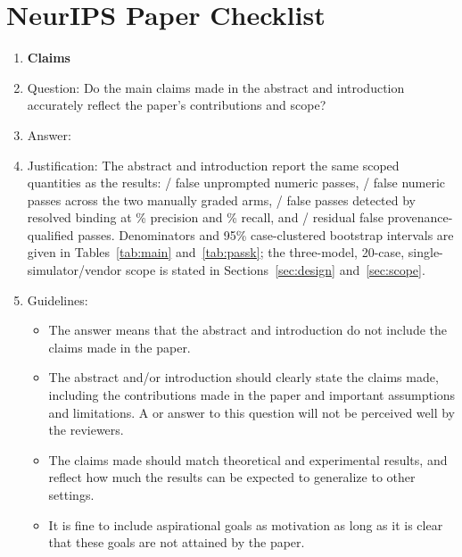 \section*{NeurIPS Paper Checklist}

\begin{enumerate}

\item {\bf Claims}
    \item[] Question: Do the main claims made in the abstract and introduction accurately reflect the paper's contributions and scope?
    \item[] Answer: \answerYes{}
    \item[] Justification: The abstract and introduction report the same scoped quantities as the results: \BareFalse{}/\BarePasses{} false unprompted numeric passes, \FalseAcceptTotal{}/\NumNumericPass{} false numeric passes across the two manually graded arms, \ProvTP{}/\FalseAcceptTotal{} false passes detected by resolved binding at \ProvPrecision{}\% precision and \ProvRecall{}\% recall, and \ProvFN{}/\StageProvAccepted{} residual false provenance-qualified passes. Denominators and 95\% case-clustered bootstrap intervals are given in Tables~\ref{tab:main} and~\ref{tab:passk}; the three-model, 20-case, single-simulator/vendor scope is stated in Sections~\ref{sec:design} and~\ref{sec:scope}.
    \item[] Guidelines:
    \begin{itemize}
        \item The answer \answerNA{} means that the abstract and introduction do not include the claims made in the paper.
        \item The abstract and/or introduction should clearly state the claims made, including the contributions made in the paper and important assumptions and limitations. A \answerNo{} or \answerNA{} answer to this question will not be perceived well by the reviewers. 
        \item The claims made should match theoretical and experimental results, and reflect how much the results can be expected to generalize to other settings. 
        \item It is fine to include aspirational goals as motivation as long as it is clear that these goals are not attained by the paper. 
    \end{itemize}


\end{enumerate}
